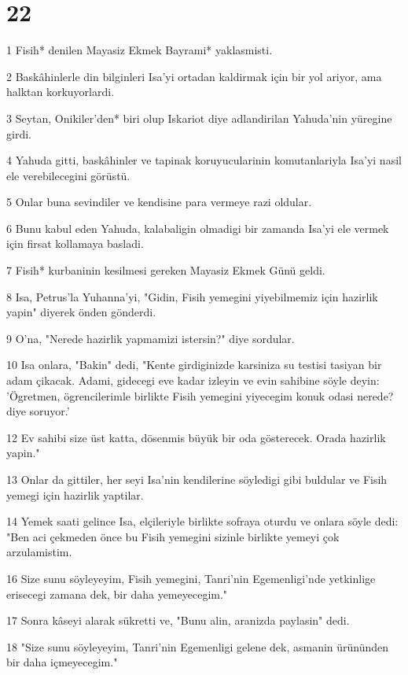 \chapter{22}

\par 1 Fisih* denilen Mayasiz Ekmek Bayrami* yaklasmisti.
\par 2 Baskâhinlerle din bilginleri Isa'yi ortadan kaldirmak için bir yol ariyor, ama halktan korkuyorlardi.
\par 3 Seytan, Onikiler'den* biri olup Iskariot diye adlandirilan Yahuda'nin yüregine girdi.
\par 4 Yahuda gitti, baskâhinler ve tapinak koruyucularinin komutanlariyla Isa'yi nasil ele verebilecegini görüstü.
\par 5 Onlar buna sevindiler ve kendisine para vermeye razi oldular.
\par 6 Bunu kabul eden Yahuda, kalabaligin olmadigi bir zamanda Isa'yi ele vermek için firsat kollamaya basladi.
\par 7 Fisih* kurbaninin kesilmesi gereken Mayasiz Ekmek Günü geldi.
\par 8 Isa, Petrus'la Yuhanna'yi, "Gidin, Fisih yemegini yiyebilmemiz için hazirlik yapin" diyerek önden gönderdi.
\par 9 O'na, "Nerede hazirlik yapmamizi istersin?" diye sordular.
\par 10 Isa onlara, "Bakin" dedi, "Kente girdiginizde karsiniza su testisi tasiyan bir adam çikacak. Adami, gidecegi eve kadar izleyin ve evin sahibine söyle deyin: 'Ögretmen, ögrencilerimle birlikte Fisih yemegini yiyecegim konuk odasi nerede? diye soruyor.'
\par 12 Ev sahibi size üst katta, dösenmis büyük bir oda gösterecek. Orada hazirlik yapin."
\par 13 Onlar da gittiler, her seyi Isa'nin kendilerine söyledigi gibi buldular ve Fisih yemegi için hazirlik yaptilar.
\par 14 Yemek saati gelince Isa, elçileriyle birlikte sofraya oturdu ve onlara söyle dedi: "Ben aci çekmeden önce bu Fisih yemegini sizinle birlikte yemeyi çok arzulamistim.
\par 16 Size sunu söyleyeyim, Fisih yemegini, Tanri'nin Egemenligi'nde yetkinlige erisecegi zamana dek, bir daha yemeyecegim."
\par 17 Sonra kâseyi alarak sükretti ve, "Bunu alin, aranizda paylasin" dedi.
\par 18 "Size sunu söyleyeyim, Tanri'nin Egemenligi gelene dek, asmanin ürününden bir daha içmeyecegim."
